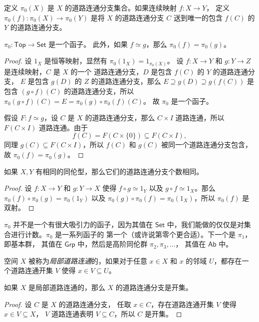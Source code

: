 \documentclass[fontset=none]{Notes}
\newcommand{\cat}[1]{\mathsf{#1}}
\begin{document}
\begin{definition}
  定义 $\pi_0(X)$ 是 $X$ 的道路连通分支集合。如果连续映射 $f:X\to Y$，
  定义 $\pi_0(f):\pi_0(X)\to\pi_0(Y)$ 是将 $X$ 的道路连通分支 $C$
  送到唯一的包含 $f(C)$ 的 $Y$ 的道路连通分支。
\end{definition}

\begin{theorem}
  $\pi_0:\cat{Top}\to \cat{Set}$ 是一个函子。
  此外，如果 $f\simeq g$，那么 $\pi_0(f)=\pi_0(g)$。 
\end{theorem}
\begin{proof}
  设 $1_X$ 是恒等映射，显然有 $\pi_0(1_X)=1_{\pi_0(X)}$。
  设 $f:X\to Y$ 和 $g:Y\to Z$ 是连续映射，$C$ 是 $X$ 的一个
  道路连通分支，$D$ 是包含 $f(C)$ 的 $Y$ 的道路连通分支，
  $E$ 是包含 $g(D)$ 的 $Z$ 的道路连通分支，那么
  $E\supseteq g(D)\supseteq g(f(C))$ 是包含 $(g\circ f)(C)$
  的道路连通分支，所以 $\pi_0(g\circ f)(C)=E=\pi_0(g)\circ \pi_0(f)(C)$。
  故 $\pi_0$ 是一个函子。

  假设 $F:f\simeq g$，设 $C$ 是 $X$ 的道路连通分支，那么 $C\times I$
  道路连通，所以 $F(C\times I)$ 道路连通。由于
  \[
    f(C)=F(C\times\{0\})\subseteq F(C\times I),
  \]
  同理 $g(C)\subseteq F(C\times I)$，所以 $f(C)$ 和 $g(C)$
  被同一个道路连通分支包含，故 $\pi_0(f)=\pi_0(g)$。
\end{proof}

\begin{corollary}
  如果 $X,Y$ 有相同的同伦型，那么它们的道路连通分支个数相同。
\end{corollary}
\begin{proof}
  设 $f:X\to Y$ 和 $g:Y\to X$ 使得 $f\circ g\simeq 1_Y$ 以及
  $g\circ f\simeq 1_X$。那么 $\pi_0(f)\circ\pi_0(g)=\pi_0(1_Y)$
  以及 $\pi_0(g)\circ\pi_0(f)=\pi_0(1_X)$，所以 $\pi_0(f)$
  是双射。
\end{proof}

$\pi_0$ 并不是一个有很大吸引力的函子，因为其值在 $\cat{Set}$
中，我们能做的仅仅是对集合进行计数。$\pi_0$ 是一系列函子的
第一个（或许说第零个更合适）。下一个是 $\pi_1$，即基本群，
其值在 $\cat{Grp}$ 中，然后是高阶同伦群 $\pi_2,\pi_3,\dots$，
其值在 $\cat{Ab}$ 中。

\begin{definition}
  空间 $X$ 被称为\emph{局部道路连通}的，如果对于任意 $x\in X$
  和 $x$ 的邻域 $U$，都存在一个道路连通开集 $V$ 使得 $x\in V\subseteq U$。
\end{definition}

\begin{theorem}
  如果 $X$ 是局部道路连通的，那么 $X$
  的道路连通分支是开集。
\end{theorem}
\begin{proof}
  设 $C$ 是 $X$ 的道路连通分支，
  任取 $x\in C$，存在道路连通开集 $V$ 使得 $x\in V\subseteq X$，
  $V$ 道路连通表明 $V\subseteq C$，所以 $C$ 是开集。
\end{proof}
\end{document}
